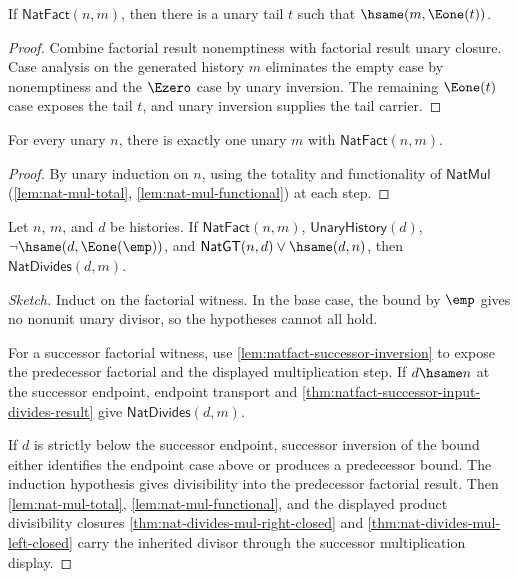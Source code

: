 \begin{theorem}
\label{thm:natfact-result-positive-shape}
If \(\mathsf{NatFact}(n,m)\), then there is a unary tail \(t\) such that
\(\hsame(m,\Eone(t))\).
\end{theorem}
\begin{proof}
Combine factorial result nonemptiness with factorial result unary closure.
Case analysis on the generated history \(m\) eliminates the empty case by
nonemptiness and the \(\Ezero\) case by unary inversion. The remaining
\(\Eone(t)\) case exposes the tail \(t\), and unary inversion supplies the
tail carrier.
\end{proof}

\begin{lemma}
\label{lem:fact-total}
For every unary \(n\), there is exactly one unary \(m\) with \(\mathsf{NatFact}(n, m)\).
\end{lemma}
\begin{proof}
By unary induction on \(n\), using the totality and functionality of \(\mathsf{NatMul}\) (\autoref{lem:nat-mul-total}, \autoref{lem:nat-mul-functional}) at each step.
\end{proof}

\begin{lemma}
\label{lem:natfact-bounded-divisor-divides-result}
Let $n$, $m$, and $d$ be histories. If $\mathsf{NatFact}(n,m)$,
$\mathsf{UnaryHistory}(d)$, $\neg\hsame(d,\Eone(\emp))$, and
$\mathsf{NatGT}(n,d)\vee\hsame(d,n)$, then $\mathsf{NatDivides}(d,m)$.
\end{lemma}
\begin{proof}[Sketch]
Induct on the factorial witness. In the base case, the bound by $\emp$ gives
no nonunit unary divisor, so the hypotheses cannot all hold.

For a successor factorial witness, use \autoref{lem:natfact-successor-inversion}
to expose the predecessor factorial and the displayed multiplication step. If
$d\hsame n$ at the successor endpoint, endpoint transport and
\autoref{thm:natfact-successor-input-divides-result} give
$\mathsf{NatDivides}(d,m)$.

If $d$ is strictly below the successor endpoint, successor inversion of the
bound either identifies the endpoint case above or produces a predecessor
bound. The induction hypothesis gives divisibility into the predecessor
factorial result. Then \autoref{lem:nat-mul-total},
\autoref{lem:nat-mul-functional}, and the displayed product divisibility
closures \autoref{thm:nat-divides-mul-right-closed} and
\autoref{thm:nat-divides-mul-left-closed} carry the inherited divisor through
the successor multiplication display.
\end{proof}

